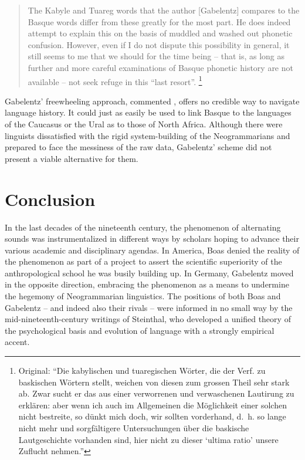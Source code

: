 \documentclass[output=paper]{langscibook}
\begin{document}
\largerpage[1]\begin{quotation}
The Kabyle and Tuareg words that the author [Gabelentz] compares to the Basque words differ from these greatly for the most part. He does indeed attempt to explain this on the basis of muddled and washed out phonetic confusion. However, even if I do not dispute this possibility in general, it still seems to me that we should for the time being -- that is, as long as further and more careful examinations of Basque phonetic history are not available -- not seek refuge in this ``last resort''. \citep[334]{Schuchardt1893}\footnote{Original: ``Die kabylischen und tuaregischen Wörter, die der Verf. zu baskischen Wörtern stellt, weichen von diesen zum grossen Theil sehr stark ab. Zwar sucht er das aus einer verworrenen und verwaschenen Lautirung zu erklären: aber wenn ich auch im Allgemeinen die Möglichkeit einer solchen nicht bestreite, so dünkt mich doch, wir sollten vorderhand, d.~h. so lange nicht mehr und sorgfältigere Untersuchungen über die baskische Lautgeschichte vorhanden sind, hier nicht zu dieser `ultima ratio' unsere Zuflucht nehmen.''}
\end{quotation}

Gabelentz' freewheeling approach, commented \citet[334]{Schuchardt1893}, offers no credible way to navigate language history. It could just as easily be used to link Basque to the languages of the Caucasus or the Ural as to those of North Africa. Although there were linguists dissatisfied with the rigid system-building of the Neogrammarians and prepared to face the messiness of the raw data, Gabelentz' scheme did not present a viable alternative for them.

\section{Conclusion}
\label{sec:mcelvenny:conc}

In the last decades of the nineteenth century, the phenomenon of alternating sounds was instrumentalized in different ways by scholars hoping to advance their various academic and disciplinary agendas. In America, Boas denied the reality of the phenomenon as part of a project to assert the scientific superiority of the anthropological school he was busily building up. In Germany, Gabelentz moved in the opposite direction, embracing the phenomenon as a means to undermine the hegemony of Neogrammarian linguistics. The positions of both Boas and Gabelentz -- and indeed also their rivals -- were informed in no small way by the mid-nineteenth-century writings of Steinthal, who developed a unified theory of the psychological basis and evolution of language with a strongly empirical accent.
\end{document}
